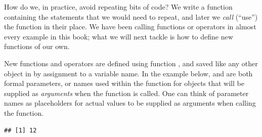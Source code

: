 \documentclass[krantz2]{krantz}\usepackage{knitr}
\begin{document}
How do we, in practice, avoid repeating bits of code? We write a function containing the statements that we would need to repeat, and later we \emph{call} (``use'') the function in their place. We have been calling \Rlang functions or operators in almost every example in this book; what we will next tackle is how to define new functions of our own.

New functions and operators are defined using function , and saved like any other object in \Rpgrm by assignment to a variable name. In the example below,  and  are both formal parameters, or names used within the function for objects that will be supplied as \emph{arguments} when the function is called. One can think of parameter names as placeholders for actual values to be supplied as arguments when calling the function.

\begin{knitrout}\footnotesize
{}\color{fgcolor}\begin{kframe}
\begin{alltt}
 \hlkwb{<-} \hlstd{(}\hlstd{,}  \hlopt{*} 
\hlstd{(}\hlstd{,} \hlstd{)}
\end{alltt}
\begin{verbatim}
## [1] 12
\end{verbatim}
\end{kframe}
\end{knitrout}
\end{document}
